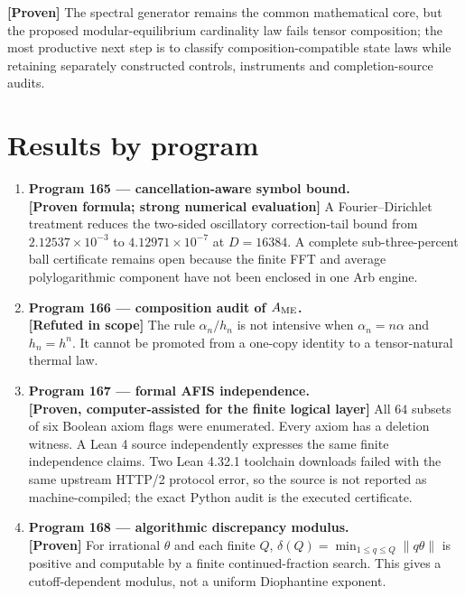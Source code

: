 \documentclass[11pt,a4paper,openany]{report}
\newcommand{\statusProven}{\textcolor{fingreen}{[Proven]}}
\newcommand{\statusRefuted}{\textcolor{finred}{[Refuted in scope]}}
\begin{document}
\textbf{\statusProven{}} The spectral generator remains the common mathematical core, but the proposed modular-equilibrium cardinality law fails tensor composition; the most productive next step is to classify composition-compatible state laws while retaining separately constructed controls, instruments and completion-source audits.

\section{Results by program}

\begin{enumerate}
\item 
\textbf{Program 165 --- cancellation-aware symbol bound.}\\
\textbf{[Proven formula; strong numerical evaluation]} A Fourier--Dirichlet treatment reduces the two-sided oscillatory correction-tail bound from \(2.12537\times10^{-3}\) to \(4.12971\times10^{-7}\) at \(D=16384\). A complete sub-three-percent ball certificate remains open because the finite FFT and average polylogarithmic component have not been enclosed in one Arb engine.

\item 
\textbf{Program 166 --- composition audit of \(A_{\rm ME}\).}\\
\textbf{\statusRefuted{}} The rule \(\alpha_n/h_n\) is not intensive when \(\alpha_n=n\alpha\) and \(h_n=h^n\). It cannot be promoted from a one-copy identity to a tensor-natural thermal law.

\item 
\textbf{Program 167 --- formal AFIS independence.}\\
\textbf{[Proven, computer-assisted for the finite logical layer]} All \(64\) subsets of six Boolean axiom flags were enumerated. Every axiom has a deletion witness. A Lean 4 source independently expresses the same finite independence claims. Two Lean 4.32.1 toolchain downloads failed with the same upstream HTTP/\allowbreak{}2 protocol error, so the source is not reported as machine-compiled; the exact Python audit is the executed certificate.

\item 
\textbf{Program 168 --- algorithmic discrepancy modulus.}\\
\textbf{\statusProven{}} For irrational \(\theta\) and each finite \(Q\), \(\delta(Q)=\min_{1\le q\le Q}\|q\theta\|\) is positive and computable by a finite continued-fraction search. This gives a cutoff-dependent modulus, not a uniform Diophantine exponent.


\end{enumerate}
\end{document}
